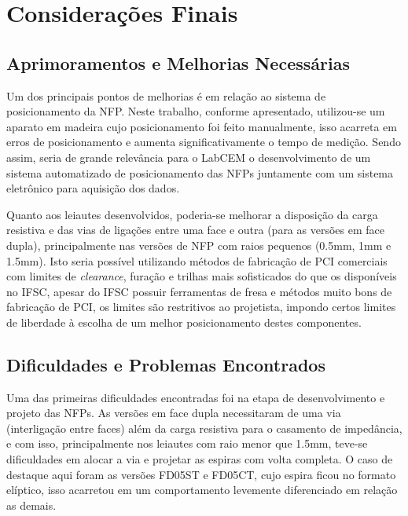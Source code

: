 
\section{Considerações Finais}

\subsection{Aprimoramentos e Melhorias Necessárias}
Um dos principais pontos de melhorias é em relação ao sistema de posicionamento da NFP. Neste trabalho, conforme apresentado, utilizou-se um aparato em madeira cujo posicionamento foi feito manualmente, isso acarreta em erros de posicionamento e aumenta significativamente o tempo de medição. Sendo assim, seria de grande relevância para o LabCEM o desenvolvimento de um sistema automatizado de posicionamento das NFPs juntamente com um sistema eletrônico para aquisição dos dados.

Quanto aos leiautes desenvolvidos, poderia-se melhorar a disposição da carga resistiva e das vias de ligações entre uma face e outra (para as versões em face dupla), principalmente nas versões de NFP com raios pequenos (0.5mm, 1mm e 1.5mm). Isto seria possível utilizando métodos de fabricação de PCI comerciais com limites de \textit{clearance}, furação e trilhas mais sofisticados do que os disponíveis no IFSC, apesar do IFSC possuir ferramentas de fresa e métodos muito bons de fabricação de PCI, os limites são restritivos ao projetista, impondo certos limites de liberdade à escolha de um melhor posicionamento destes componentes.

\subsection{Dificuldades e Problemas Encontrados}
Uma das primeiras dificuldades encontradas foi na etapa de desenvolvimento e projeto das NFPs. As versões em face dupla necessitaram de uma via (interligação entre faces) além da carga resistiva para o casamento de impedância, e com isso, principalmente nos leiautes com raio menor que 1.5mm, teve-se dificuldades em alocar a via e projetar as espiras com volta completa. O caso de destaque aqui foram as versões FD05ST e FD05CT, cujo espira ficou no formato elíptico, isso acarretou em um comportamento levemente diferenciado em relação as demais.

